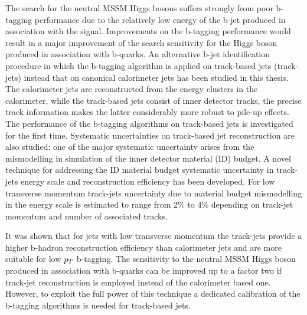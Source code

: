 The search for the neutral MSSM Higgs bosons suffers  strongly from poor b-tagging performance due to the relatively low energy of
the b-jet produced in association with the signal. Improvements on the b-tagging performance would result in a major improvement of the search sensitivity
for the Higgs boson produced in association with b-quarks. 
An alternative b-jet identification procedure in which the b-tagging algorithm is applied on 
track-based jets (track-jets) instead that on canonical calorimeter jets has been studied in this thesis.
The calorimeter jets are reconstructed
from the energy clusters in the calorimeter, while the track-based jets consist of inner detector tracks,
the precise track information makes the latter considerably more robust to pile-up effects.
The performance of the b-tagging algorithms on track-based jets is investigated for the first time.
Systematic uncertainties on track-based jet reconstruction are also studied: one of the major systematic
uncertainty arises from the mismodelling in simulation of the inner detector material (ID)  budget.
A novel technique for addressing the ID material budget systematic uncertainty in track-jets energy scale and 
reconstruction efficiency has been developed. For low transverse momentum track-jets uncertainty due to 
material budget mismodelling in the energy scale is estimated to range from 2\% to 4\% depending on track-jet momentum and number of 
associated tracks.

It was shown that for jets with low transverse momentum the track-jets provide a higher
b-hadron reconstruction efficiency than calorimeter jets and are more suitable  for
low $p_{T}$ b-tagging. The sensitivity to the neutral MSSM Higgs boson produced in association with b-quarks can be improved 
 up to a factor two if track-jet reconstruction is employed instead of the calorimeter based one.
However, to exploit the full power of this technique a dedicated calibration of the 
b-tagging algorithms is  needed for  track-based jets. 















